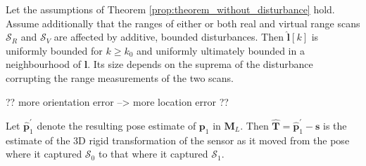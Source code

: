 \begin{theorem}
  \label{prop:theorem_with_disturbance} Let the assumptions of Theorem
  \ref{prop:theorem_without_disturbance} hold. Assume additionally that the
  ranges of either or both real and virtual range scans $\mathcal{S}_R$ and
  $\mathcal{S}_V$ are affected by additive, bounded disturbances. Then
  $\hat{\bm{l}}[k]$ is uniformly bounded for $k \geq k_0$ and uniformly
  ultimately bounded in a neighbourhood of $\bm{l}$. Its size depends on the
  suprema of the disturbance corrupting the range measurements of the two
  scans.
\end{theorem}

?? more orientation error --> more location error ??

Let $\hat{\bm{p}}_1^\prime$ denote the resulting pose estimate of $\bm{p}_1$
in $\bm{M}_L$. Then $\hat{\bm{T}} = \hat{\bm{p}}_1^\prime - \bm{s}$ is the
estimate of the 3D rigid transformation of the sensor as it moved from the pose
where it captured $\mathcal{S}_0$ to that where it captured $\mathcal{S}_1$.
